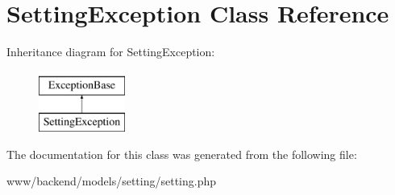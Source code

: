 \hypertarget{classSettingException}{
\section{SettingException Class Reference}
\label{classSettingException}
}
Inheritance diagram for SettingException:\begin{figure}[H]
\begin{center}
\leavevmode
\includegraphics[height=2.000000cm]{classSettingException}
\end{center}
\end{figure}


The documentation for this class was generated from the following file:\begin{DoxyCompactItemize}
\item 
www/backend/models/setting/setting.php\end{DoxyCompactItemize}
